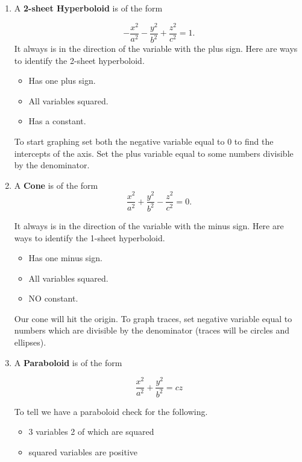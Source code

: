 \documentclass[11pt]{article}
\begin{document}
\begin{enumerate}
To start graphing set the negative variable equal to 0 and $\pm\sqrt{\text{denominator}}$ for 3 traces (which will always be circles or ellipses).

\item A \textbf{2-sheet Hyperboloid} is of the form 

\begin{equation*}
    -\frac{x^2}{a^2}-\frac{y^2}{b^2}+\frac{z^2}{c^2}=1.
\end{equation*} 
It always is in the direction of the variable with the plus sign. Here are ways to identify the 2-sheet hyperboloid.
\begin{itemize}
    \item Has one plus sign.
    \item All variables squared.
    \item Has a constant.
\end{itemize}

To start graphing set both the negative variable equal to 0 to find the intercepts of the axis. Set the plus variable equal to some numbers divisible by the denominator.

\item A \textbf{Cone} is of the form 
\begin{equation*}
    \frac{x^2}{a^2}+\frac{y^2}{b^2}-\frac{z^2}{c^2}=0.
\end{equation*} 

It always is in the direction of the variable with the minus sign. Here are ways to identify the 1-sheet hyperboloid.
\begin{itemize}
    \item Has one minus sign.
    \item All variables squared.
    \item NO constant.
\end{itemize}

Our cone will hit the origin. To graph traces, set negative variable equal to numbers which are divisible by the denominator (traces will be circles and ellipses).

\item A \textbf{Paraboloid} is of the form

\begin{equation*}
    \frac{x^2}{a^2}+\frac{y^2}{b^2}=cz
\end{equation*}

To tell we have a paraboloid check for the following.

\begin{itemize}
    \item 3 variables 2 of which are squared
    \item squared variables are positive
\end{itemize}


\end{enumerate}
\end{document}
